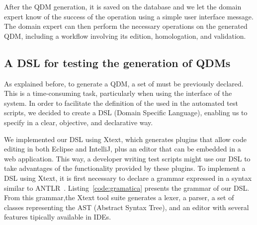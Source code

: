 After the QDM generation, it is saved on the database and we let the domain expert know 
of the success of the operation using a simple user interface message. 
The domain expert can then perform the necessary operations on the generated QDM, including a workflow 
involving  its edition, homologation, and validation.  

\subsection{A DSL for testing the generation of QDMs}

As explained before, to generate a QDM, a set of \callers must be previously 
declared. This is a time-consuming task, particularly when using the interface of 
the system. In order to facilitate the definition of the \callers used in the automated test scripts, we 
decided to create a DSL (Domain Specific Language), enabling us to specify \callers in a 
clear, objective, and declarative way. 

We implemented our DSL using Xtext, which generates plugins that allow
code editing in both Eclipse and IntelliJ, plus an editor that can be
embedded in a web application. This way, a developer writing test scripts might
use our DSL to take advantages of the functionality provided by these plugins.
To implement a DSL using Xtext, it is first necessary to declare a grammar expressed
in a syntax similar to ANTLR~\cite{parr2013}. Listing~\ref{code:gramatica} presents
the grammar of our DSL. From this grammar,the Xtext tool suite generates a lexer, a parser, a
set of classes representing the AST (Abstract Syntax Tree), and an editor with several features
tipically available in IDEs.

